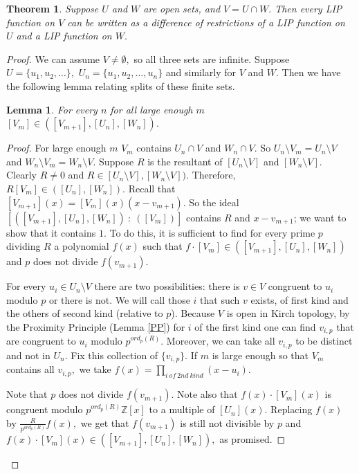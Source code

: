 \documentclass[10pt,a4paper]{amsart}
\newtheorem{lemma}{Lemma}
\newtheorem{theorem}{Theorem}
\begin{document}
\begin{theorem} \label{MainH1} Suppose $U$ and $W$ are open sets, and $V=U\cap W.$ Then every LIP function on $V$ can be written as a difference of restrictions of a LIP function on $U$ and a LIP function on $W.$
\end{theorem}

\begin{proof}
We can assume $V \neq \emptyset ,$ so all three sets are infinite. Suppose $U=\{u_1,u_2,\dots \},$ $U_n=\{u_1,u_2,\dots, u_n\}$ and similarly for $V$ and $W$. Then we have the following lemma relating splits of these finite sets.

\begin{lemma} For every $n$ for all large enough $m$ $[V_m] \in ( [V_{m+1}], [U_n], [W_n]).$
\end{lemma}

\begin{proof} For large enough $m$  $V_m$ contains $U_n\cap V$ and $W_n\cap V.$ So $U_n\setminus V_m= U_n\setminus V$ and $W_n\setminus V_m= W_n\setminus V$. Suppose $R$ is the resultant of $[U_n\setminus V]$ and $[W_n\setminus V]$. Clearly $R\neq 0$ and $R\in [U_n\setminus V], [W_n \setminus V]).$ Therefore, $R[V_m] \in ([U_n],[W_n]).$  Recall that $[V_{m+1}](x)=[V_m](x) (x-v_{m+1}).$ So the ideal $[  ( [V_{m+1}], [U_n], [W_n]) \ : \ ([V_m] )]$ contains $R$ and $x-v_{m+1}$; we want to show that it contains $1$. To do this, it is sufficient to find for every prime $p$ dividing $R$ a polynomial $f(x)$ such that $f \cdot [V_m] \in ( [V_{m+1}], [U_n], [W_n])$ and $p$ does not divide $ f(v_{m+1})$.

For every $u_i\in U_n\setminus V$ there are two possibilities: there is $v\in V$ congruent to $u_i$ modulo $p$ or there is not. We will call those $i$ that such $v$ exists, of first kind and the others of second kind (relative to $p$). Because $V$ is open in Kirch topology, by the Proximity Principle (Lemma \ref{PP}) for $i$ of the first kind one can find $v_{i,p}$ that are congruent to $u_i$ modulo $p^{ord_p(R)}.$ Moreover, we can take all $v_{i,p}$ to be distinct and not in $U_n$. Fix this collection of $\{v_{i,p}\}$. If $m$ is large enough so that $V_m$ contains all  $v_{i,p},$ we take $f(x) = \prod \limits_{i\ of\ 2nd\  kind} (x-u_i). $

Note that $p$ does not divide $f(v_{m+1})$. Note also that $f(x)\cdot [V_m](x)$ is congruent modulo $p^{ord_p(R)}\mathbb Z[x]$ to a multiple of $[U_n](x).$ Replacing $f(x)$ by $\frac{R}{p^{ord_p(R)} }f(x),$ we get that $f(v_{m+1})$ is still not divisible by $p$ and $f(x)\cdot [V_m](x) \in ( [V_{m+1}], [U_n], [W_n]),$ as promised.
\end{proof}



\end{proof}
\end{document}
